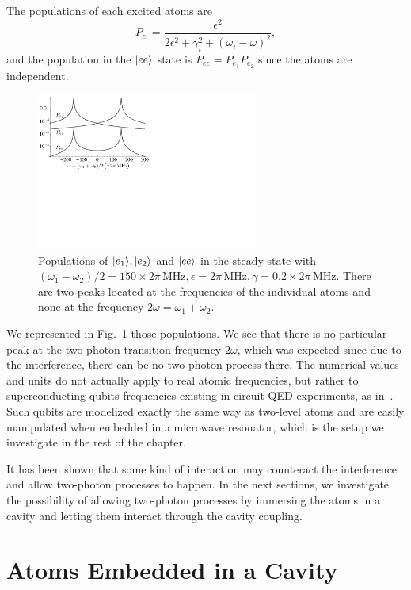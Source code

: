 The populations of each excited atoms are
\[ P_{e_i} =  \frac{\epsilon^2}{2\epsilon^2+ \gamma_i^2 + (\omega_i-\omega)^2} , \]
and the population in the $| ee \rangle$ state is $P_{ee}= P_{e_1}  P_{e_2}$ since the atoms are independent.

\begin{figure}
\center
\includegraphics[width=0.65\textwidth]{Images/chap5/free.pdf} 
\caption[Populations in the steady-state]{Populations of $| e_1 \rangle, | e_2 \rangle$ and $| ee \rangle$ in the steady state with $(\omega_1 - \omega_2)/2 = 150 \times 2\pi\,\mbox{MHz}, \epsilon=2\pi\,\mbox{MHz}, \gamma=0.2  \times 2\pi\,\mbox{MHz}$. There are two peaks located at the frequencies of the individual atoms and none at the frequency $2 \omega = \omega_1 + \omega_2$.}
\label{fig-free}
\end{figure}

We represented in Fig.~\ref{fig-free} those populations. We see that there is no particular peak at the two-photon transition frequency $2\omega$, which was expected since due to the interference, there can be no two-photon process there. The numerical values and units do not actually apply to real atomic frequencies, but rather to superconducting qubits frequencies existing in circuit QED experiments, as in~\cite{Fin09}. Such qubits are modelized exactly the same way as two-level atoms and are easily manipulated when embedded in a microwave resonator, which is the setup we investigate in the rest of the chapter.

It has been shown that some kind of interaction may counteract the interference and allow two-photon processes to happen\cite{Var92}. In the next sections, we investigate the possibility of allowing two-photon processes by immersing the atoms in a cavity and letting them interact through the cavity coupling.

\section{Atoms Embedded in a Cavity} \label{sec-QEDMod}

